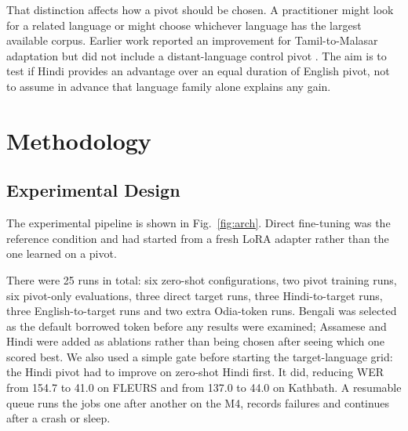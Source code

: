 \documentclass[conference]{IEEEtran}
\begin{document}
That distinction affects how a pivot should be chosen. A practitioner might look for a related language or might choose whichever language has the largest available corpus. Earlier work reported an improvement for Tamil-to-Malasar adaptation but did not include a distant-language control pivot \cite{pillai2026multistage}. The aim is to test if Hindi provides an advantage over an equal duration of English pivot, not to assume in advance that language family alone explains any gain.

\section{Methodology}

\subsection{Experimental Design}

The experimental pipeline is shown in Fig.~\ref{fig:arch}. Direct fine-tuning was the reference condition and had started from a fresh LoRA adapter rather than the one learned on a pivot.

There were 25 runs in total: six zero-shot configurations, two pivot training runs, six pivot-only evaluations, three direct target runs, three Hindi-to-target runs, three English-to-target runs and two extra Odia-token runs. Bengali was selected as the default borrowed token before any results were examined; Assamese and Hindi were added as ablations rather than being chosen after seeing which one scored best. We also used a simple gate before starting the target-language grid: the Hindi pivot had to improve on zero-shot Hindi first. It did, reducing WER from 154.7 to 41.0 on FLEURS and from 137.0 to 44.0 on Kathbath. A resumable queue runs the jobs one after another on the M4, records failures and continues after a crash or sleep.
\end{document}
